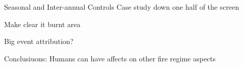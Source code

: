 Seasonal and Inter-annual Controls
Case study down one half of the screen


Make clear it burnt area

Big event attribution?

Conclusiuons:
    Humans can have affects on other fire regime aspects
